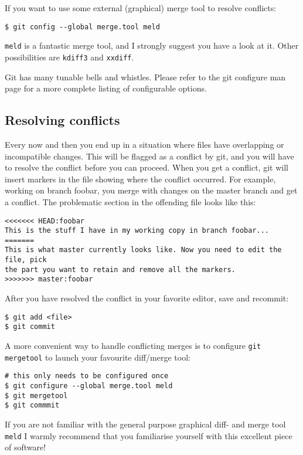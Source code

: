 \documentclass[a4paper,10pt]{article}
\begin{document}
If you want to use some external (graphical) merge tool to resolve conflicts:
\begin{verbatim}
$ git config --global merge.tool meld
\end{verbatim}
\texttt{meld} is a fantastic merge tool, and I strongly suggest you have a
look at it.  Other possibilities are \texttt{kdiff3} and \texttt{xxdiff}.

Git has many tunable bells and whistles. Please refer to the git configure
man page for a more complete listing of configurable options.

\subsection{Resolving conflicts}
\label{sec:conflict}
Every now and then you end up in a situation where files have overlapping or
incompatible changes. This will be flagged as a conflict by git, and you will
have to resolve the conflict before you can proceed. When you get a conflict,
git will insert markers in the file showing where the conflict occurred. For
example, working on branch foobar, you merge with changes on the master branch
and get a conflict. The problematic section in the offending file looks like
this:
\begin{verbatim}
<<<<<<< HEAD:foobar
This is the stuff I have in my working copy in branch foobar...
=======
This is what master currently looks like. Now you need to edit the file, pick
the part you want to retain and remove all the markers.
>>>>>>> master:foobar
\end{verbatim}
After you have resolved the conflict in your favorite editor, save and
recommit:
\begin{verbatim}
$ git add <file>
$ git commit
\end{verbatim}
A more convenient way to handle conflicting merges is to configure
\texttt{git mergetool} to launch your favourite diff/merge tool:
\begin{verbatim}
# this only needs to be configured once
$ git configure --global merge.tool meld
$ git mergetool
$ git commmit
\end{verbatim}
If you are not familiar with the general purpose graphical diff- and merge
tool \texttt{meld} I warmly recommend that you familiarise yourself with this
excellent piece of software!
\end{document}
